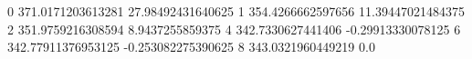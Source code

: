 0 371.0171203613281 27.98492431640625
1 354.4266662597656 11.39447021484375
2 351.9759216308594 8.9437255859375
4 342.7330627441406 -0.29913330078125
6 342.77911376953125 -0.253082275390625
8 343.0321960449219 0.0
